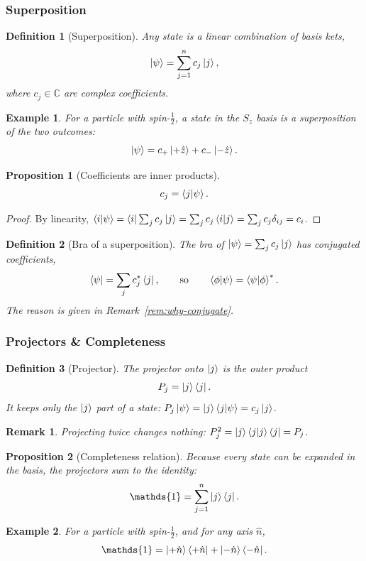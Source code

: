 \documentclass{article}
\newtheorem{definition}{Definition}
\newtheorem*{example}{Example}
\newtheorem{remark}{Remark}
\newtheorem{proposition}{Proposition}
\newcommand{\id}{\mathds{1}}
\begin{document}
\subsubsection{Superposition}
\begin{definition}[Superposition]
    Any state is a linear combination of basis kets,
    \begin{equation}
        \ket{\psi} = \sum_{j=1}^{n} c_j\ket{j},
    \end{equation}
    where $c_j \in \mathbb{C}$ are complex coefficients.
\end{definition}
\begin{example}
    For a particle with spin-$\tfrac{1}{2}$, a state in the $S_z$ basis is a superposition of the two outcomes:
    \[\ket{\psi} = c_{+}\ket{+\hat{z}} + c_{-}\ket{-\hat{z}}.\]
\end{example}
\begin{proposition}[Coefficients are inner products]
    \begin{equation}
        c_j = \braket{j|\psi}.
    \end{equation}
\end{proposition}
\begin{proof}
    By linearity, $\braket{i|\psi} = \bra{i}\sum_j c_j\ket{j} = \sum_j c_j\braket{i|j} = \sum_j c_j\delta_{ij} = c_i$.
\end{proof}
\begin{definition}[Bra of a superposition]
    \label{def:bra-superposition}
    The bra of $\ket{\psi} = \sum_j c_j\ket{j}$ has conjugated coefficients,
    \begin{equation}
        \bra{\psi} = \sum_j c_j^*\bra{j}, \qquad \text{so} \qquad \braket{\phi|\psi} = \braket{\psi|\phi}^{*}.
    \end{equation}
    The reason is given in Remark~\ref{rem:why-conjugate}.
\end{definition}

\subsubsection{Projectors \& Completeness}
\begin{definition}[Projector]
    The projector onto $\ket{j}$ is the outer product
    \[P_j = \ket{j}\bra{j}.\]
    It keeps only the $\ket{j}$ part of a state: $P_j\ket{\psi} = \ket{j}\braket{j|\psi} = c_j\ket{j}$.
\end{definition}
\begin{remark}
    Projecting twice changes nothing: $P_j^2 = \ket{j}\braket{j|j}\bra{j} = P_j$.
\end{remark}
\begin{proposition}[Completeness relation]
    Because every state can be expanded in the basis, the projectors sum to the identity:
    \begin{equation}
        \id = \sum_{j=1}^{n}\ket{j}\bra{j}.
    \end{equation}
\end{proposition}
\begin{example}
    For a particle with spin-$\tfrac{1}{2}$, and for any axis $\hat{n}$,
    \[\id = \ket{+\hat{n}}\bra{+\hat{n}} + \ket{-\hat{n}}\bra{-\hat{n}}.\]
\end{example}
\end{document}
